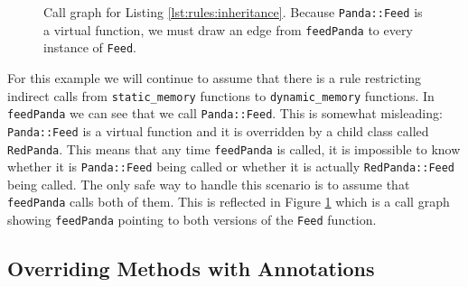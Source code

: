 \begin{figure}
    \centering
    \caption{Call graph for Listing \ref{lst:rules:inheritance}.  Because \lstinline{Panda::Feed} is a virtual function, we must draw an edge from \lstinline{feedPanda} to every instance of \lstinline{Feed}.}
    \label{fig:rules:inheritance}
\end{figure}

For this example we will continue to assume that there is a rule restricting indirect calls from \lstinline{static_memory} functions to \lstinline{dynamic_memory} functions.  In \lstinline{feedPanda} we can see that we call \lstinline{Panda::Feed}.  This is somewhat misleading:  \lstinline{Panda::Feed} is a virtual function and it is overridden by a child class called \lstinline{RedPanda}.  This means that any time \lstinline{feedPanda} is called, it is impossible to know whether it is \lstinline{Panda::Feed} being called or whether it is actually \lstinline{RedPanda::Feed} being called.  The only safe way to handle this scenario is to assume that \lstinline{feedPanda} calls both of them.  This is reflected in Figure \ref{fig:rules:inheritance} which is a call graph showing \lstinline{feedPanda} pointing to both versions of the \lstinline{Feed} function.  

\subsection{Overriding Methods with Annotations}

